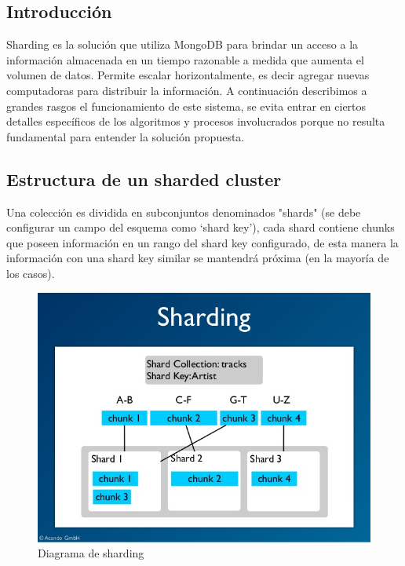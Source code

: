 \subsection{Introducción}

Sharding es la solución que utiliza MongoDB para brindar un acceso a la información almacenada en un tiempo razonable
a medida que aumenta el volumen de datos. 
Permite escalar horizontalmente, es decir agregar nuevas computadoras para distribuir la información.
A continuación describimos a grandes rasgos el funcionamiento de este sistema, se evita entrar en ciertos detalles
específicos de los algoritmos y procesos involucrados porque no resulta fundamental para entender la solución propuesta.\\

\subsection{Estructura de un sharded cluster}

Una colección es dividida en subconjuntos denominados "shards" (se debe configurar un campo del esquema como `shard key'), cada shard
contiene chunks que poseen información en un rango del shard key configurado, de esta manera la información con una shard key similar
se mantendrá próxima (en la mayoría de los casos). 

\begin{figure}[h!]
 \centering
 \includegraphics[scale=0.35,keepaspectratio=true]{./sharding.jpg}
 \caption{Diagrama de sharding}
\end{figure}


